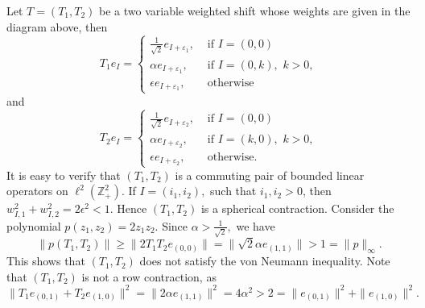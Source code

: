 \documentclass[12pt,reqno] {amsart}
\theoremstyle{remark}
\theoremstyle{definition}
\begin{document}
Let $T=(T_1,T_2)$ be a two variable weighted shift whose weights are given in the diagram above, then
 \[
T_1 e_I=\left\{ \begin{array}{rl}
   \frac{1}{\sqrt{2}}e_{I+\varepsilon_1}, & \text{ if } I=(0,0)\\
   \alpha e_{I+\varepsilon_1}, & \text{ if } I=(0,k), \,\, k>0,\\
   \epsilon e_{I+\varepsilon_1}, &  \text{ otherwise}
                                   \end{array} \right. 
 \] and
 \[
T_2 e_I=\left\{ \begin{array}{rl}
   \frac{1}{\sqrt{2}}e_{I+\varepsilon_2}, & \text{ if } I=(0,0)\\
   \alpha e_{I+\varepsilon_2}, & \text{ if } I=(k,0), \,\, k>0,\\
   \epsilon e_{I+\varepsilon_2}, &  \text{ otherwise.}
                                   \end{array} \right. 
 \]
It is easy to verify that $(T_1,T_2)$  is a commuting pair of bounded linear operators on $\ell^2(\mathbb{Z}_+^2).$ If $I=(i_1,i_2),$ such that $i_1, i_2>0$, then $w^2_{I,1} + w^2_{I,2}=2 \epsilon^2 < 1.$ Hence $(T_1,T_2)$ is a spherical contraction. 
Consider the polynomial $p(z_1,z_2)= 2z_1 z_2.$ Since $\alpha > \frac{1}{\sqrt{2}},$ we have 
$$\|p(T_1,T_2)\|\geq \|2T_1T_2e_{(0,0)}\| = \|\sqrt{2} \alpha e_{(1,1)}\| > 1=\|p\|_{\infty}.$$
This shows that $(T_1,T_2)$ does not satisfy the von Neumann inequality. 
Note that $(T_1,T_2)$ is not a row contraction, as
\[\|T_1e_{(0,1)} + T_2e_{(1,0)}\|^2 = \|2\alpha e_{(1,1)}\|^2 = 4\alpha^2 > 2=\|e_{(0,1)}\|^2 + \|e_{(1,0)}\|^2.\]
\end{document}
